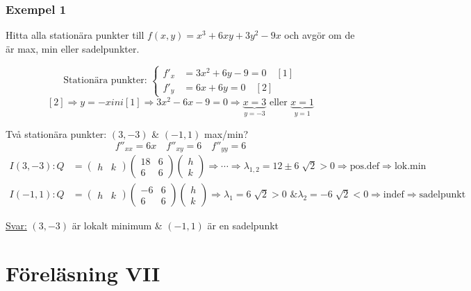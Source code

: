 \documentclass[a4paper]{article}
\let\oldsqrt\sqrt
\renewcommand*{\sqrt}[2][\ ]{\oldsqrt[#1]{#2} }
\begin{document}
\subsubsection{Exempel 1}
Hitta alla stationära punkter till $f(x,y) = x^3 + 6xy + 3y^2 - 9x$ och avgör om de är max, min eller sadelpunkter.

$$
	\text{Stationära punkter: }
	\left\{
	\begin{array}{rcl}
	f'_x &= 3x^2 + 6y - 9 = 0 \quad [1] \\
	f'_y &= 6x + 6y = 0 \quad [2]
	\end{array}\right.
$$
$$
	[2] \Rightarrow y = -x in i [1] \Rightarrow 3x^2 - 6x - 9 = 0 \Rightarrow \underbrace{x=3}_{y=-3} \text{ eller } \underbrace{x=1}_{y=1}
$$

Två stationära punkter: $(3,-3)$ \& $(-1,1)$ max/min?
$$
	f''_{xx} = 6x \quad f''_{xy} = 6 \quad f''_{yy} = 6
$$
\begin{align*}
	I(3,-3): Q &= 
	\begin{pmatrix}
		h & k
	\end{pmatrix}
	\begin{pmatrix}
		18 & 6 \\
		6 & 6
	\end{pmatrix}
	\begin{pmatrix}
		h \\ 
		k
	\end{pmatrix}
	\Rightarrow \cdots \Rightarrow \lambda_{1,2} = 12 \pm 6\sqrt{2} > 0 \Rightarrow \text{pos.def} \Rightarrow \text{lok.min} \\
	I(-1,1): Q &= 
	\begin{pmatrix}
		h & k
	\end{pmatrix}
	\begin{pmatrix}
		-6 & 6 \\
		6 & 6
	\end{pmatrix}
	\begin{pmatrix}
		h \\ 
		k
	\end{pmatrix}
	\Rightarrow \lambda_1 = 6\sqrt{2} > 0 \text{ \& } \lambda_2 = -6\sqrt{2} < 0 \Rightarrow \text{indef} \Rightarrow \text{sadelpunkt}
\end{align*}

\underline{Svar:} $(3,-3)$ är lokalt minimum \& $(-1,1)$ är en sadelpunkt





\newpage
\section{Föreläsning VII}
\end{document}
